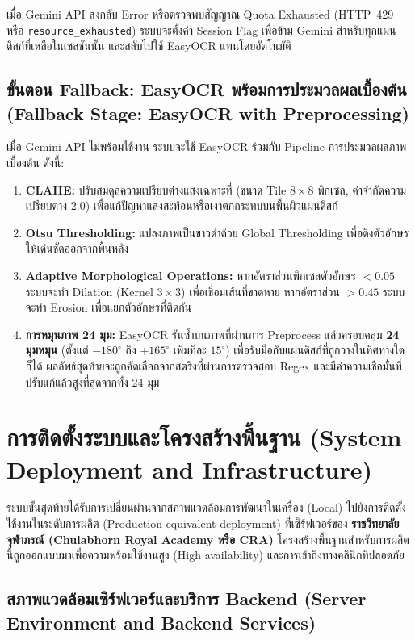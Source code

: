 เมื่อ Gemini API ส่งกลับ Error หรือตรวจพบสัญญาณ Quota Exhausted (HTTP~429 หรือ \texttt{resource\_exhausted}) ระบบจะตั้งค่า Session Flag เพื่อข้าม Gemini สำหรับทุกแผ่นดิสก์ที่เหลือในเซสชันนั้น และสลับไปใช้ EasyOCR แทนโดยอัตโนมัติ

\subsection{ขั้นตอน Fallback: EasyOCR พร้อมการประมวลผลเบื้องต้น (Fallback Stage: EasyOCR with Preprocessing)}

เมื่อ Gemini API ไม่พร้อมใช้งาน ระบบจะใช้ EasyOCR \cite{jaidedai2024easyocr} ร่วมกับ Pipeline การประมวลผลภาพเบื้องต้น ดังนี้:
\begin{enumerate}
  \item \textbf{CLAHE:} ปรับสมดุลความเปรียบต่างแสงเฉพาะที่ (ขนาด Tile $8 \times 8$ พิกเซล, ค่าจำกัดความเปรียบต่าง 2.0) เพื่อแก้ปัญหาแสงสะท้อนหรือเงาตกกระทบบนพื้นผิวแผ่นดิสก์
  \item \textbf{Otsu Thresholding:} แปลงภาพเป็นขาวดำด้วย Global Thresholding เพื่อดึงตัวอักษรให้เด่นชัดออกจากพื้นหลัง
  \item \textbf{Adaptive Morphological Operations:} หากอัตราส่วนพิกเซลตัวอักษร $< 0.05$ ระบบจะทำ Dilation (Kernel $3 \times 3$) เพื่อเชื่อมเส้นที่ขาดหาย หากอัตราส่วน $> 0.45$ ระบบจะทำ Erosion เพื่อแยกตัวอักษรที่ติดกัน
  \item \textbf{การหมุนภาพ 24 มุม:} EasyOCR รันซ้ำบนภาพที่ผ่านการ Preprocess แล้วครอบคลุม \textbf{24 มุมหมุน} (ตั้งแต่ $-180^\circ$ ถึง $+165^\circ$ เพิ่มทีละ $15^\circ$) เพื่อรับมือกับแผ่นดิสก์ที่ถูกวางในทิศทางใดก็ได้ ผลลัพธ์สุดท้ายจะถูกคัดเลือกจากสตริงที่ผ่านการตรวจสอบ Regex และมีค่าความเชื่อมั่นที่ปรับแก้แล้วสูงที่สุดจากทั้ง 24 มุม
\end{enumerate}

\section{การติดตั้งระบบและโครงสร้างพื้นฐาน (System Deployment and Infrastructure)}

ระบบขั้นสุดท้ายได้รับการเปลี่ยนผ่านจากสภาพแวดล้อมการพัฒนาในเครื่อง (Local) ไปยังการติดตั้งใช้งานในระดับการผลิต (Production-equivalent deployment) ที่เซิร์ฟเวอร์ของ \textbf{ราชวิทยาลัยจุฬาภรณ์ (Chulabhorn Royal Academy หรือ CRA)} โครงสร้างพื้นฐานสำหรับการผลิตนี้ถูกออกแบบมาเพื่อความพร้อมใช้งานสูง (High availability) และการเข้าถึงทางคลินิกที่ปลอดภัย

\subsection{สภาพแวดล้อมเซิร์ฟเวอร์และบริการ Backend (Server Environment and Backend Services)}

